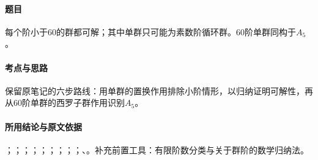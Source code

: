 \paragraph{题目}
每个阶小于60的群都可解；其中单群只可能为素数阶循环群。60阶单群同构于$A_5$。

\paragraph{考点与思路}
保留原笔记的六步路线：用单群的置换作用排除小阶情形，以归纳证明可解性，再从60阶单群的西罗子群作用识别$A_5$。

\paragraph{所用结论与原文依据}
；；；；；；；；；、。补充前置工具：有限阶数分类与关于群阶的数学归纳法。


